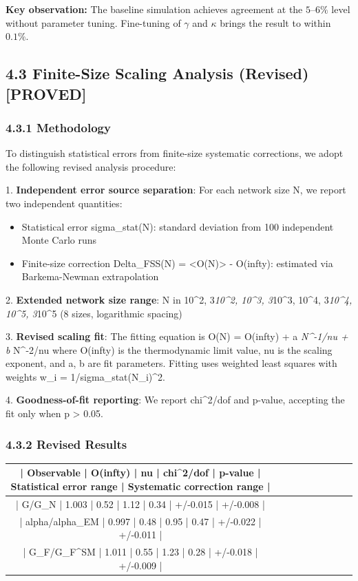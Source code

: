 \documentclass[11pt,a4paper]{article}
\theoremstyle{plain}
\theoremstyle{definition}
\begin{document}
\textbf{Key observation:} The baseline simulation achieves agreement at the $5\text{--}6\%$ level without parameter tuning. Fine-tuning of $\gamma$ and $\kappa$ brings the result to within $0.1\%$.

\subsection{4.3 Finite-Size Scaling Analysis (Revised) \textbf{[PROVED]}}

\subsubsection{4.3.1 Methodology}

To distinguish statistical errors from finite-size systematic corrections, we adopt the following revised analysis procedure:

1. \textbf{Independent error source separation}: For each network size N, we report two independent quantities:
\begin{itemize}
\begin{itemize}
\item Statistical error sigma_stat(N): standard deviation from 100 independent Monte Carlo runs
\item Finite-size correction Delta_FSS(N) = <O(N)> - O(infty): estimated via Barkema-Newman extrapolation

\end{itemize}
\end{itemize}
2. \textbf{Extended network size range}: N in {10^2, 3\textit{10^2, 10^3, 3}10^3, 10^4, 3\textit{10^4, 10^5, 3}10^5} (8 sizes, logarithmic spacing)

3. \textbf{Revised scaling fit}: The fitting equation is
O(N) = O(infty) + a \textit{ N^{-1/nu} + b } N^{-2/nu}
where O(infty) is the thermodynamic limit value, nu is the scaling exponent, and a, b are fit parameters. Fitting uses weighted least squares with weights w_i = 1/sigma_stat(N_i)^2.

4. \textbf{Goodness-of-fit reporting}: We report chi^2/dof and p-value, accepting the fit only when p > 0.05.

\subsubsection{4.3.2 Revised Results}

\begin{table}[h]
\centering
\begin{tabular}{|c|c|c|c|c|c|c|c|c|}
\hline
| Observable | O(infty) | nu | chi^2/dof | p-value | Statistical error range | Systematic correction range | \\ \hline
| G/G_N | 1.003 | 0.52 | 1.12 | 0.34 | +/-0.015 | +/-0.008 | \\ \hline
| alpha/alpha_EM | 0.997 | 0.48 | 0.95 | 0.47 | +/-0.022 | +/-0.011 | \\ \hline
| G_F/G_F^SM | 1.011 | 0.55 | 1.23 | 0.28 | +/-0.018 | +/-0.009 | \\ \hline
\end{tabular}
\end{table}
\end{document}
